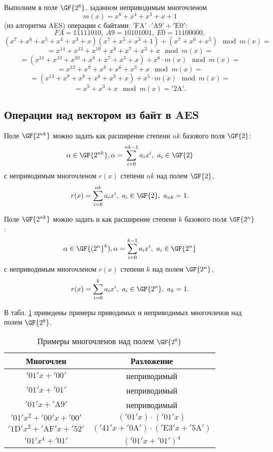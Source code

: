 \example
Выполним в поле $\GF{2^8}$, заданном неприводимым многочленом
    \[ m(x) = x^8 + x^4 + x^3 + x + 1 \]
(из алгоритма AES) операции с байтами: $\mathrm{'FA'} \cdot \mathrm{'A9'} + \mathrm{'E0'}$:
    \[ FA = 11111010, ~ A9 = 10101001, ~ E0 = 11100000, \]
    \[ (x^7 + x^6 + x^5 + x^4 + x^3  +x)(x^7 + x^5 + x^3 + 1) + (x^7 + x^6 + x^5) \mod m(x) = \]
    \[ = x^{14} + x^{13} + x^{10} + x^{8} + x^7 + x^3 + x \mod m(x) = \]
    \[ = (x^{14} + x^{13} + x^{10} + x^{8} + x^7 + x^3 + x) + x^6 \cdot m(x) \mod m(x) = \]
    \[ = x^{13} + x^9 + x^8 + x^6 + x^3 + x \mod m(x) = \]
    \[ = (x^{13} + x^9 + x^8 + x^6 + x^3 + x) + x^5 \cdot m(x) \mod m(x) = \]
    \[ = x^5 + x^3 + x \mod m(x) = \mathrm{'2A'}. \]
\exampleend


\subsection{Операции над вектором из байт в AES}

Поле $\GF{2^{nk}}$ можно задать как расширение степени $nk$ базового поля $\GF{2}$:
    \[ \alpha \in \GF{2^{nk}}, \alpha = \sum\limits_{i=0}^{nk-1} a_i x^i, ~ a_i \in \GF{2} \]
с неприводимым многочленом $r(x)$ степени $nk$ над полем $\GF{2}$,
    \[ r(x) = \sum\limits_{i=0}^{nk} a_i x^i, ~ a_i \in \GF{2}, ~ a_{nk} = 1. \]

Поле $\GF{2^{nk}}$ можно задать и как расширение степени $k$ базового поля $\GF{2^n}$:
    \[ \alpha \in \GF{(2^n}^k), \alpha = \sum\limits_{i=0}^{k-1} a_i x^i, ~ a_i \in \GF{2^n} \]
с неприводимым многочленом $r(x)$ степени $k$ над полем $\GF{2^n}$,
    \[ r(x) = \sum\limits_{i=0}^{k} a_i x^i, ~ a_i \in \GF{2^n}, ~ a_k = 1. \]

\example
В табл. \ref{tab:irreducible-gf8} приведены примеры приводимых и неприводимых многочленов над полем $\GF{2^8}$.
\begin{table}[!ht]
    \centering
    \caption{Примеры многочленов над полем $\GF{2^8}$\label{tab:irreducible-gf8}}
    \begin{tabular}{|c|c|}
        \hline
        Многочлен & Разложение \\
        \hline
        $\mathrm{'01'} x + \mathrm{'00'}$ & неприводимый \\
        $\mathrm{'01'} x + \mathrm{'01'}$ & неприводимый \\
        $\mathrm{'01'} x + \mathrm{'A9'}$ & неприводимый \\
        $\mathrm{'01'} x^2 + \mathrm{'00'} x + \mathrm{'00'}$ & $(\mathrm{'01'} x) \cdot (\mathrm{'01'} x)$ \\
        $\mathrm{'1D'} x^2 + \mathrm{'AF'} x + \mathrm{'52'}$ & $(\mathrm{'41'} x + \mathrm{'0A'}) \cdot (\mathrm{'E3'} x + \mathrm{'5A'})$ \\
        $\mathrm{'01'} x^4 + \mathrm{'01'}$ & $(\mathrm{'01'} x + \mathrm{'01'})^4$ \\
        \hline
    \end{tabular}
\end{table}
\exampleend

